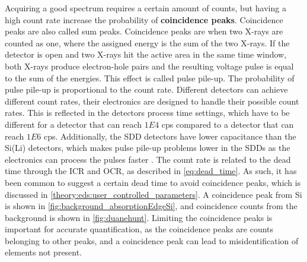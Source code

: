 Acquiring a good spectrum requires a certain amount of counts, but having a high count rate increase the probability of \textbf{coincidence peaks}.
Coincidence peaks are also called sum peaks.
Coincidence peaks are when two X-rays are counted as one, where the assigned energy is the sum of the two X-rays.
If the detector is open and two X-rays hit the active area in the same time window, both X-rays produce electron-hole pairs and the resulting voltage pulse is equal to the sum of the energies.
This effect is called pulse pile-up.
The probability of pulse pile-up is proportional to the count rate.
Different detectors can achieve different count rates, their electronics are designed to handle their possible count rates.
This is reflected in the detectors process time settings, which have to be different for a detector that can reach $1E4$ cps compared to a detector that can reach $1E6$ cps.
Additionally, the SDD detectors have lower capacitance than the Si(Li) detectors, which makes pulse pile-up problems lower in the SDDs as the electronics can process the pulses faster \cite{astm_e1508_eds_quantification}.
The count rate is related to the dead time through the ICR and OCR, as described in \cref{eq:dead_time}.
As such, it has been common to suggest a certain dead time to avoid coincidence peaks, which is discussed in \cref{theory:eds:user_controlled_parameters}.
A coincidence peak from Si is shown in \cref{fig:background_absorptionEdgeSi}, and coincidence counts from the background is shown in \cref{fig:duanehunt}.
Limiting the coincidence peaks is important for accurate quantification, as the coincidence peaks are counts belonging to other peaks, and a coincidence peak can lead to misidentification of elements not present.





